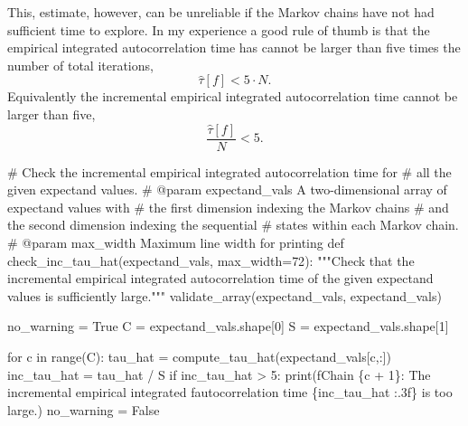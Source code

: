 \documentclass[
  letterpaper,
  DIV=11,
  numbers=noendperiod]{scrartcl}
\newenvironment{Shaded}{\begin{snugshade}}{\end{snugshade}}
\newcommand{\BuiltInTok}[1]{\textcolor[rgb]{0.00,0.23,0.31}{#1}}
\newcommand{\CommentTok}[1]{\textcolor[rgb]{0.37,0.37,0.37}{#1}}
\newcommand{\ControlFlowTok}[1]{\textcolor[rgb]{0.00,0.23,0.31}{#1}}
\newcommand{\DecValTok}[1]{\textcolor[rgb]{0.68,0.00,0.00}{#1}}
\newcommand{\KeywordTok}[1]{\textcolor[rgb]{0.00,0.23,0.31}{#1}}
\newcommand{\NormalTok}[1]{\textcolor[rgb]{0.00,0.23,0.31}{#1}}
\newcommand{\OperatorTok}[1]{\textcolor[rgb]{0.37,0.37,0.37}{#1}}
\newcommand{\SpecialCharTok}[1]{\textcolor[rgb]{0.37,0.37,0.37}{#1}}
\newcommand{\SpecialStringTok}[1]{\textcolor[rgb]{0.13,0.47,0.30}{#1}}
\newcommand{\StringTok}[1]{\textcolor[rgb]{0.13,0.47,0.30}{#1}}
\newcommand{\VariableTok}[1]{\textcolor[rgb]{0.07,0.07,0.07}{#1}}
\begin{document}
This, estimate, however, can be unreliable if the Markov chains have not
had sufficient time to explore. In my experience a good rule of thumb is
that the empirical integrated autocorrelation time has cannot be larger
than five times the number of total iterations, \[
\hat{\tau}[f] < 5 \cdot N.
\] Equivalently the incremental empirical integrated autocorrelation
time cannot be larger than five, \[
\frac{ \hat{\tau}[f] }{N} < 5.
\]

\begin{Shaded}
\begin{Highlighting}[]
\CommentTok{\# Check the incremental empirical integrated autocorrelation time for}
\CommentTok{\# all the given expectand values.}
\CommentTok{\# @param expectand\_vals A two{-}dimensional array of expectand values with}
\CommentTok{\#                       the first dimension indexing the Markov chains}
\CommentTok{\#                       and the second dimension indexing the sequential}
\CommentTok{\#                       states within each Markov chain.}
\CommentTok{\# @param max\_width Maximum line width for printing}
\KeywordTok{def}\NormalTok{ check\_inc\_tau\_hat(expectand\_vals, max\_width}\OperatorTok{=}\DecValTok{72}\NormalTok{):}
  \CommentTok{"""Check that the incremental empirical integrated autocorrelation}
\CommentTok{     time of the given expectand values is sufficiently large."""}
\NormalTok{  validate\_array(expectand\_vals, }\StringTok{\textquotesingle{}expectand\_vals\textquotesingle{}}\NormalTok{)}

\NormalTok{  no\_warning }\OperatorTok{=} \VariableTok{True}
\NormalTok{  C }\OperatorTok{=}\NormalTok{ expectand\_vals.shape[}\DecValTok{0}\NormalTok{]}
\NormalTok{  S }\OperatorTok{=}\NormalTok{ expectand\_vals.shape[}\DecValTok{1}\NormalTok{]}

  \ControlFlowTok{for}\NormalTok{ c }\KeywordTok{in} \BuiltInTok{range}\NormalTok{(C):}
\NormalTok{    tau\_hat }\OperatorTok{=}\NormalTok{ compute\_tau\_hat(expectand\_vals[c,:])}
\NormalTok{    inc\_tau\_hat }\OperatorTok{=}\NormalTok{ tau\_hat }\OperatorTok{/}\NormalTok{ S}
    \ControlFlowTok{if}\NormalTok{ inc\_tau\_hat }\OperatorTok{\textgreater{}} \DecValTok{5}\NormalTok{:}
      \BuiltInTok{print}\NormalTok{(}\SpecialStringTok{f\textquotesingle{}Chain }\SpecialCharTok{\{}\NormalTok{c }\OperatorTok{+} \DecValTok{1}\SpecialCharTok{\}}\SpecialStringTok{: The incremental empirical integrated \textquotesingle{}}
            \SpecialStringTok{f\textquotesingle{}autocorrelation time }\SpecialCharTok{\{}\NormalTok{inc\_tau\_hat }\SpecialCharTok{:.3f\}}\SpecialStringTok{ is too large.\textquotesingle{}}\NormalTok{)}
\NormalTok{      no\_warning }\OperatorTok{=} \VariableTok{False}


\end{Highlighting}
\end{Shaded}
\end{document}
